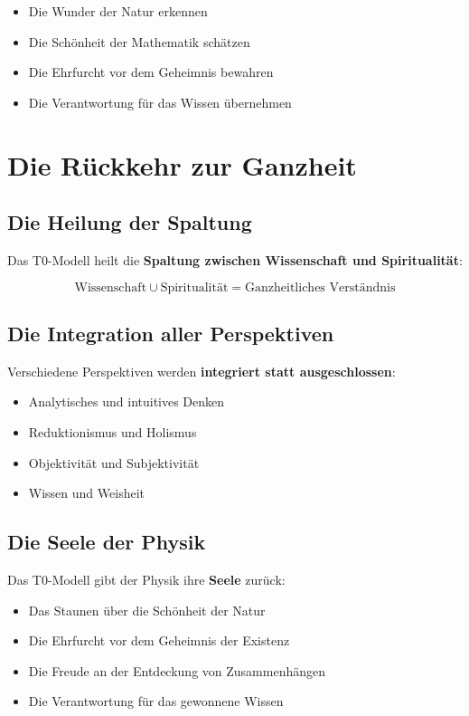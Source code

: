 \documentclass[12pt,a4paper]{report}
\begin{document}
	\begin{itemize}
		\item Die Wunder der Natur erkennen
		\item Die Schönheit der Mathematik schätzen
		\item Die Ehrfurcht vor dem Geheimnis bewahren
		\item Die Verantwortung für das Wissen übernehmen
	\end{itemize}
	
	\section{Die Rückkehr zur Ganzheit}
	
	\subsection{Die Heilung der Spaltung}
	
	Das T0-Modell heilt die \textbf{Spaltung zwischen Wissenschaft und Spiritualität}:
	
	\begin{equation}
		\text{Wissenschaft} \cup \text{Spiritualität} = \text{Ganzheitliches Verständnis}
	\end{equation}
	
	\subsection{Die Integration aller Perspektiven}
	
	Verschiedene Perspektiven werden \textbf{integriert statt ausgeschlossen}:
	
	\begin{itemize}
		\item Analytisches und intuitives Denken
		\item Reduktionismus und Holismus
		\item Objektivität und Subjektivität
		\item Wissen und Weisheit
	\end{itemize}
	
	\subsection{Die Seele der Physik}
	
	Das T0-Modell gibt der Physik ihre \textbf{Seele} zurück:
	
	\begin{itemize}
		\item Das Staunen über die Schönheit der Natur
		\item Die Ehrfurcht vor dem Geheimnis der Existenz
		\item Die Freude an der Entdeckung von Zusammenhängen
		\item Die Verantwortung für das gewonnene Wissen
	\end{itemize}
	
\end{document}
